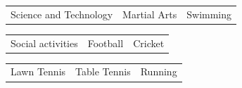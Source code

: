 

\begin{tabularx}{\textwidth}{@{}X X X@{}}
\makefield{\faBookmark} {Science and Technology}
%
&
%
\makefield{\faBookmark} {Martial Arts}
%
&
%
\makefield{\faBookmark} {Swimming}
%
\\

\end{tabularx}


\begin{tabularx}{\textwidth}{@{}X X X@{}}
%
\makefield{\faBookmark} {Social activities}
%
&
%
\makefield{\faBookmark} {Football}
%
&
%
\makefield{\faBookmark} {Cricket}
%
\\

\end{tabularx}


\begin{tabularx}{\textwidth}{@{}X X X@{}}
%
\makefield{\faBookmark} {Lawn Tennis}
%
&
%
\makefield{\faBookmark} {Table Tennis}
%
&
%
\makefield{\faBookmark} {Running}

\\

\end{tabularx}
